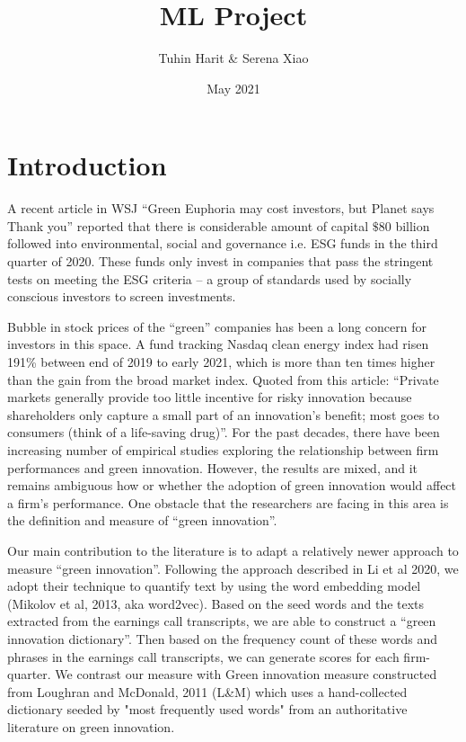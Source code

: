 \documentclass[10pt]{article}
\title{ML Project}
\author{Tuhin Harit \& Serena Xiao }
\date{May 2021}
\begin{document}
\maketitle

\section{Introduction}
A recent article in WSJ “Green Euphoria may cost investors, but Planet says Thank you” reported that there is considerable amount of capital $\$80$ billion followed into environmental, social and governance i.e. ESG funds in the third quarter of 2020. These funds only invest in companies that pass the stringent tests on meeting the ESG criteria – a group of standards used by socially conscious investors to screen investments. 






Bubble in stock prices of the “green” companies has been a long concern for investors in this space. A fund tracking Nasdaq clean energy index had risen 191\% between end of 2019 to early 2021, which is more than ten times higher than the gain from the broad market index. Quoted from this article: “Private markets generally provide too little incentive for risky innovation because shareholders only capture a small part of an innovation’s benefit; most goes to consumers (think of a life-saving drug)”. For the past decades, there have been increasing number of empirical studies exploring the relationship  between firm performances and green innovation. However, the results are mixed, and it remains ambiguous how or whether the adoption of green innovation would affect a firm’s performance. One obstacle that the researchers are facing in this area is the definition and measure of “green innovation”. 

Our main contribution to the literature is to adapt a relatively newer approach to measure “green innovation”. Following the approach described in Li et al 2020, we adopt their technique to quantify text by using the word embedding model (Mikolov et al, 2013, aka word2vec). Based on the seed words and the texts extracted from the earnings call transcripts, we are able to construct a “green innovation dictionary”. Then based on the frequency count of these words and phrases in the earnings call transcripts, we can generate scores for each firm-quarter. We contrast our measure with Green innovation measure constructed from Loughran and McDonald, 2011 (L\&M) which uses a hand-collected dictionary seeded by "most frequently used words" from an authoritative literature on green innovation.
\end{document}
